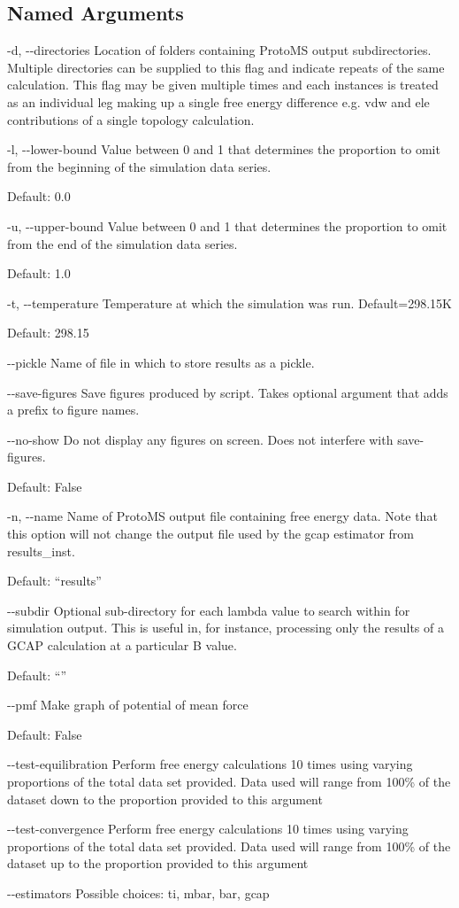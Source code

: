 \documentclass[letterpaper,10pt,english]{sphinxmanual}
\begin{document}
\subsection{Named Arguments}
\label{\detokenize{tools:Named Arguments}}\begin{optionlist}{3cm}
\item [-d, -{-}directories]  
Location of folders containing ProtoMS output subdirectories. Multiple directories can be supplied to this flag and indicate repeats of the same calculation. This flag may be given multiple times and each instances is treated as an individual leg making up a single free energy difference e.g. vdw and ele contributions of a single topology calculation.
\item [-l, -{-}lower-bound]  
Value between 0 and 1 that determines the proportion to omit from the beginning of the simulation data series.

Default: 0.0
\item [-u, -{-}upper-bound]  
Value between 0 and 1 that determines the proportion to omit from the end of the simulation data series.

Default: 1.0
\item [-t, -{-}temperature]  
Temperature at which the simulation was run. Default=298.15K

Default: 298.15
\item [-{-}pickle]  
Name of file in which to store results as a pickle.
\item [-{-}save-figures]  
Save figures produced by script. Takes optional argument that adds a prefix to figure names.
\item [-{-}no-show]  
Do not display any figures on screen. Does not interfere with \textendash{}save-figures.

Default: False
\item [-n, -{-}name]  
Name of ProtoMS output file containing free energy data. Note that this option will not change the output file used by the gcap estimator from results\_inst.

Default: “results”
\item [-{-}subdir]  
Optional sub-directory for each lambda value to search within for simulation output. This is useful in, for instance, processing only the results of a GCAP calculation at a particular B value.

Default: “”
\item [-{-}pmf]  
Make graph of potential of mean force

Default: False
\item [-{-}test-equilibration]  
Perform free energy calculations 10 times using varying proportions of the total data set provided. Data used will range from 100\% of the dataset down to the proportion provided to this argument
\item [-{-}test-convergence]  
Perform free energy calculations 10 times using varying proportions of the total data set provided. Data used will range from 100\% of the dataset up to the proportion provided to this argument
\item [-{-}estimators]  
Possible choices: ti, mbar, bar, gcap


\end{optionlist}
\end{document}
